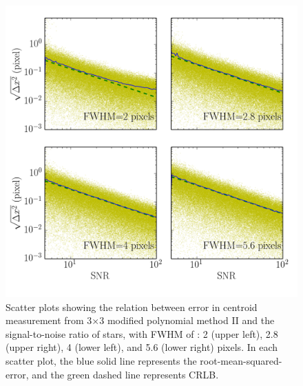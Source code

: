 \documentclass[12pt, preprint]{aastex}
\begin{document}
\begin{figure}[!htb]
  \includegraphics[width=\linewidth]{snr_psfpoly.png}
\endminipage
\caption{Scatter plots showing the relation between error in centroid
measurement from 3$\times$3 modified polynomial method II and the signal-to-noise
ratio of stars, with FWHM of : 2 (upper left), 2.8 (upper right), 4 (lower left),
and 5.6 (lower right) pixels. In each scatter plot, the blue solid line represents the root-mean-squared-error, and the green dashed line represents CRLB.}\label{3}
\end{figure}
\end{document}
